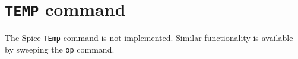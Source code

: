 %
%
%
%
\section{{\tt TEMP} command}
The Spice {\tt TEmp} command is not implemented.  Similar
functionality is available by sweeping the {\tt op} command.
